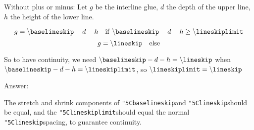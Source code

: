 \def\\{\char"5C}
\def\bls{{\tt \\baselineskip}}
\def\ls{{\tt \\lineskip}}
\def\lsl{{\tt \\lineskiplimit}}

Without plus or minus:
Let $g$ be the interline glue, 
$d$ the depth of the upper line,
$h$ the height of the lower line.

$$
g = 
\bls - d - h \quad {\rm if\ } \bls -d -h \ge \lsl
$$
$$
g=
\ls \quad {\rm else}
$$

So to have continuity, we need
$\bls - d - h = \ls$ when $\bls -d -h = \lsl$, so $\lsl = \ls$

Answer:

The stretch and shrink components of \bls and \ls should
be equal, and the \lsl should equal the normal \ls spacing, to
guarantee continuity.


\bye

